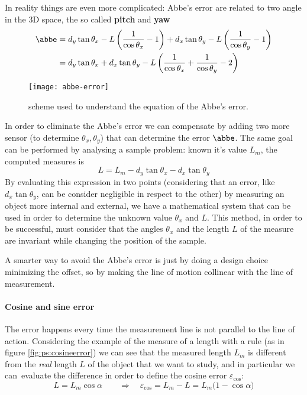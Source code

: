 	In reality things are even more complicated: Abbe's error are related to two angle in the 3D space, the so called \textbf{pitch} and \textbf{yaw}
	\begin{equation}
	\begin{split}		
		\abbe & = d_y \tan\theta_x - L \left(\frac 1 {\cos\theta_x} - 1\right) + d_x \tan\theta_y - L \left(\frac 1 {\cos\theta_y} - 1\right) \\
		& = d_y \tan\theta_x + d_x\tan\theta_y - L\left( \frac 1 {\cos\theta_x} + \frac 1 {\cos\theta_y} - 2 \right)
	\end{split}
	\end{equation}
	
	\begin{SCfigure}[2][bht]
		\centering
		\texttt{[image: abbe-error]}
		\caption{scheme used to understand the equation of the Abbe's error.} 
	\end{SCfigure}

	In order to eliminate the Abbe's error we can compensate by adding two more sensor (to determine $\theta_x,\theta_y$) that can determine the error $\abbe$. The same goal can be performed by analysing a sample problem: known it's value $L_m$, the computed measures is
	\[ L = L_m - d_y\tan\theta_x - d_x\tan\theta_y \]
	By evaluating this expression in two points (considering that an error, like $d_x\tan\theta_y$, can be consider negligible in respect to the other) by measuring an object more internal and external, we have a mathematical system that can be used in order to determine the unknown value $\theta_x$ and $L$. This method, in order to be successful, must consider that the angles $\theta_x$ and the length $L$ of the measure are invariant while changing the position of the sample.
	
	A smarter way to avoid the Abbe's error is just by doing a design choice minimizing the offset, so by making the line of motion collinear with the line of measurement.
	
	\paragraph{Cosine and sine error} The  error happens every time the measurement line is not parallel to the line of action. Considering the example of the measure of a length with a rule (as in figure \ref{fig:ps:cosineerror}) we can see that the measured length $L_m$ is different from the \textit{real} length $L$ of the object that we want to study, and in particular we can\ evaluate the difference in order to define the cosine error $\varepsilon_{\cos}$:
	\begin{equation}
		L = L_m \cos\alpha \qquad \Rightarrow \quad \varepsilon_{\cos} = L_m - L = L_m \big(1-\cos\alpha\big)
	\end{equation}
	
